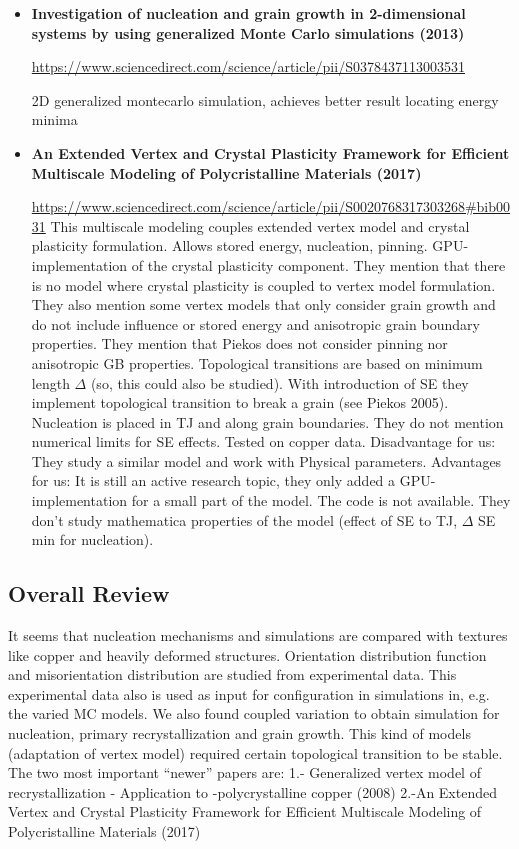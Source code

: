 \begin{itemize}
\item \textbf{Investigation of nucleation and grain growth in 2-dimensional systems by using generalized Monte Carlo simulations (2013)}

\url{https://www.sciencedirect.com/science/article/pii/S0378437113003531}

2D generalized montecarlo simulation, achieves better result locating energy minima

\item \textbf{An Extended Vertex and Crystal Plasticity Framework for Efficient Multiscale Modeling of Polycristalline Materials (2017)}

\url{https://www.sciencedirect.com/science/article/pii/S0020768317303268#bib0031}
This multiscale modeling couples extended vertex model and crystal plasticity formulation. Allows stored energy, nucleation, pinning. GPU-implementation of the crystal plasticity component. They mention that there is no model where crystal plasticity is coupled to vertex model formulation. They also mention some vertex models that only consider grain growth and do not include influence or stored energy and anisotropic grain boundary properties. They mention that Piekos does not consider pinning nor anisotropic GB properties. Topological transitions are based on minimum length  $\Delta$ (so, this could also be studied). With introduction of SE they implement topological transition to break a grain (see Piekos 2005). Nucleation is placed in TJ and along grain boundaries. They do not mention numerical limits for SE effects. Tested on copper data.
Disadvantage for us: They study a similar model and work with Physical parameters. 
Advantages for us: It is still an active research topic, they only added a GPU-implementation for a small part of the model. The code is not available. They don’t study mathematica properties of the model (effect of SE to TJ, $\Delta$ SE min for nucleation).
\end{itemize}

\subsection{Overall Review}

It seems that nucleation mechanisms and simulations are compared with textures like copper and heavily deformed structures.
Orientation distribution function and misorientation distribution are studied from experimental data.  This experimental data also is used as input for configuration in simulations in, e.g. the varied MC models.
We also found coupled variation to obtain simulation for nucleation, primary recrystallization and grain growth. This kind of models (adaptation of vertex model) required certain topological transition to be stable.
The two most important “newer” papers are:
1.- Generalized vertex model of recrystallization - Application to -polycrystalline copper (2008)
2.-An Extended Vertex and Crystal Plasticity Framework for Efficient Multiscale Modeling of Polycristalline Materials (2017)

